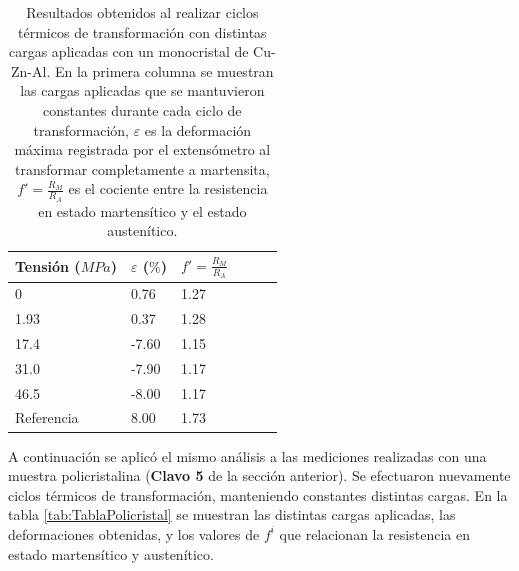 \documentclass[a4paper,12pt,fleqn,twoside,openany]{book}
\begin{document}
\begin{table} 
\begin{center} 
\begin{tabular}{@{}llllll@{}} \toprule
Tensión ($MPa$) & $\varepsilon$ ($\%$) &  $f'=\frac{R_M}{R_A}$\\ \midrule
 0        &  0.76   & 1.27\\
 1.93       &  0.37   & 1.28\\
 17.4      &  -7.60  & 1.15\\
 31.0      &  -7.90  & 1.17\\
 46.5     &  -8.00  & 1.17  \\
 Referencia \cite{resistencia}    & 8.00  &  1.73   \\
 \bottomrule
\end{tabular}
\caption{Resultados obtenidos al realizar ciclos térmicos de transformación con distintas cargas aplicadas con un monocristal de Cu-Zn-Al. En la primera columna se muestran las cargas aplicadas que se mantuvieron constantes durante cada ciclo de transformación, $\varepsilon$ es la deformación máxima registrada por el extensómetro al transformar completamente a martensita, $f'=\frac{R_M}{R_A}$ es el cociente entre la resistencia en estado martensítico y el estado austenítico.}
\label{tab:TablaMonocristal}
\end{center}
\end{table}


A continuación se aplicó el mismo análisis a las mediciones realizadas con una muestra policristalina (\textbf{Clavo 5} de la sección anterior). Se efectuaron nuevamente ciclos térmicos de transformación, manteniendo constantes distintas cargas. En la tabla \ref{tab:TablaPolicristal} se muestran las distintas cargas aplicadas, las deformaciones obtenidas, y los valores de $f^i$ que relacionan la resistencia en estado martensítico y austenítico. 
\end{document}
